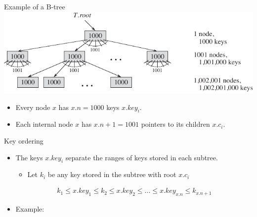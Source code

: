 \documentclass[11pt,t]{beamer}
\begin{document}
	\begin{frame}{Example of a B-tree}
		\centering
		\includegraphics{images/nodes_keys}
		\vspace{0.5cm}
		\begin{itemize}[<+->]
			\item Every node \(x\) has \(x.n=1000\) keys \(x.key_i\).
			\item Each internal node \(x\) has \(x.n+1=1001\) pointers to its children \(x.c_i\).
		\end{itemize}
	\end{frame}

	\begin{frame}{Key ordering}
		\begin{itemize}[<+->]
			\item The keys \(x.key_i\) separate the ranges of keys stored in each subtree. \begin{itemize}[<+->]
				\item Let \(k_i\) be any key stored in the subtree with root \(x.c_i\)
			\end{itemize}
			\onslide<+-> \begin{align*}
				k_1 \leq x.key_1 \leq k_2 \leq x.key_2 \leq \ldots \leq x.key_{x.n} \leq k_{x.n+1}
			\end{align*} \vspace{-0.8cm}
			\item Example:
		\end{itemize}
		\centering
		\vspace{0.5cm}
	\end{frame}
\end{document}
